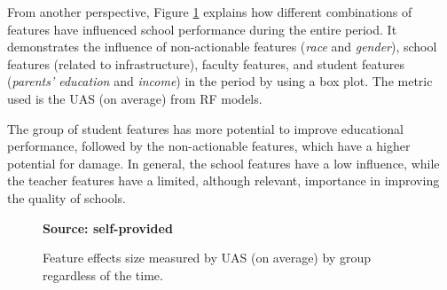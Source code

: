 From another perspective, Figure \ref{fig:groups_variable} explains how different combinations of features have influenced school performance during the entire period. It demonstrates the influence of non-actionable features (\textit{race} and \textit{gender}), school features (related to infrastructure), faculty features, and student features (\textit{parents’ education} and \textit{income}) in the period by using a box plot. The metric used is the UAS (on average) from RF models. 

The group of student features has more potential to improve educational performance, followed by the non-actionable features, which have a higher potential for damage. In general, the school features have a low influence, while the teacher features have a limited, although relevant, importance in improving the quality of schools. 

\begin{figure}[ht!]
\centering
\caption{\textmd{Feature effects size measured by UAS (on average) by group regardless of the time.}}
\label{fig:groups_variable}
\par\medskip\ABNTEXfontereduzida\selectfont\textbf{Source: self-provided}  
\par\medskip
\end{figure}
